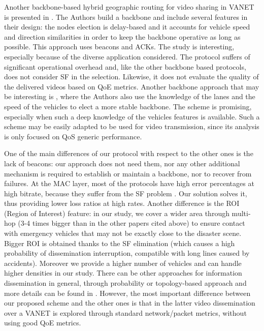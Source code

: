 \documentclass{acm_proc_article-sp}
\begin{document}
Another backbone-based hybrid geographic routing for video sharing in VANET is presented in \cite{VideoBackboneDiFelice}. The Authors build a backbone and include several features in their design: the nodes election is delay-based and it accounts for vehicle speed and direction similarities in order to keep the backbone operative as long as possible. This approach uses beacons and ACKs. The study is interesting, especially because of the diverse application considered. The protocol suffers of significant operational overhead and, like the other backbone based protocols, does not consider SF in the selection.  Likewise, it does not evaluate the quality of the delivered videos based on QoE metrics.
Another backbone approach that may be interesting is \cite{medhocrubin}, where the Authors also use the knowledge of the lanes and the speed of the vehicles to elect a more stable backbone. The scheme is promising, especially when such a deep knowledge of the vehicles features is available. Such a scheme may be easily adapted to be used for video transmission, since its analysis is only focused on QoS generic performance.

One of the main differences of our protocol with respect to the other ones is the lack of beacons: our approach does not need them, nor any other additional mechanism is required to establish or maintain a backbone, nor to recover from failures.
At the MAC layer, most of the protocols have high error percentages at high bitrate, because they suffer from the SF problem \cite{VTCDeFelice}. Our solution solves it, thus providing lower loss ratios at high rates.
Another difference is the ROI (Region of Interest) feature: in our study, we cover a wider area through multi-hop (3-4 times bigger than in the other papers cited above) to ensure contact with emergency vehicles that may not be exactly close to the disaster scene. Bigger ROI is obtained thanks to the SF elimination (which causes a high probability of dissemination interruption, compatible with long lines caused by accidents). Moreover  we provide a higher number of vehicles and can handle higher densities in our study.
There can be other approaches for information dissemination in general, through probability or topology-based approach and more details can be found in \cite{dissemination}. However, the most important difference between our proposed scheme and the other ones is that in the latter video dissemination over a VANET is explored through standard network/packet metrics, without using good QoE metrics.
\end{document}
